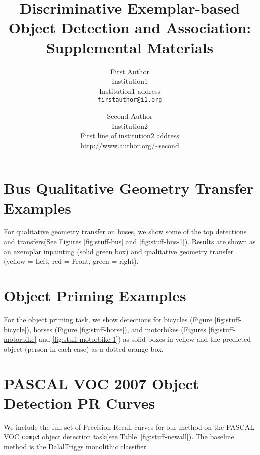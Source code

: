 \documentclass[10pt,letterpaper]{article}
\begin{document}
\title{Discriminative Exemplar-based Object Detection and Association: Supplemental Materials}

\author{First Author\\
Institution1\\
Institution1 address\\
{\tt\small firstauthor@i1.org}
\and
Second Author\\
Institution2\\
First line of institution2 address\\
{\small\url{http://www.author.org/~second}}
}

\maketitle
\tableofcontents

\newpage
\section{Bus Qualitative Geometry Transfer Examples}
For qualitative geometry transfer on buses, we show some of the top
detections and transfers(See Figures
\ref{fig:stuff-bus} and \ref{fig:stuff-bus-1}). Results are shown as an
exemplar inpainting (solid green box) and qualitative geometry
transfer (yellow = Left, red = Front, green = right).




\section{Object Priming Examples}
For the object priming task, we show detections for bicycles (Figure
\ref{fig:stuff-bicycle}), horses (Figure
\ref{fig:stuff-horse}), and motorbikes (Figures
\ref{fig:stuff-motorbike} and \ref{fig:stuff-motorbike-1}) as solid
boxes in yellow and the predicted object (person in each case) as a
dotted orange box.





\section{PASCAL VOC 2007 Object Detection PR Curves}
We include the full set of Precision-Recall curves for our method on the
PASCAL VOC \verb+comp3+ object detection task(see Table~\ref{fig:stuff-newall}).  The baseline method is
the DalalTriggs monolithic classifier.
\newpage
\end{document}
